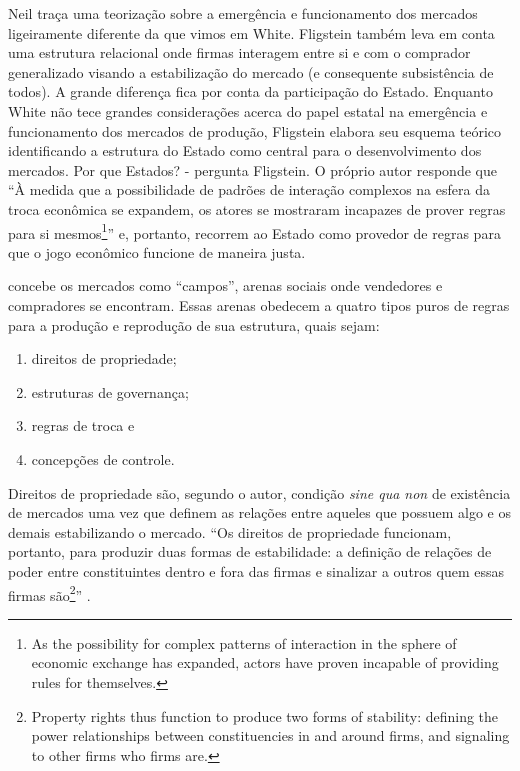\documentclass[a4paper, 12pt, openright, oneside, german, french, english, brazil]{abntex2}
\begin{document}
	Neil  traça uma teorização sobre a emergência e funcionamento dos mercados ligeiramente diferente da que vimos em White. Fligstein também leva em conta uma estrutura relacional onde firmas interagem entre si e com o comprador generalizado visando a estabilização do mercado (e consequente subsistência de todos). A grande diferença fica por conta da participação do Estado. Enquanto White não tece grandes considerações acerca do papel estatal na emergência e funcionamento dos mercados de produção, Fligstein elabora seu esquema teórico identificando a estrutura do Estado como central para o desenvolvimento dos mercados. Por que Estados? - pergunta Fligstein. O próprio autor responde que ``À medida que a possibilidade de padrões de interação complexos na esfera da troca econômica se expandem, os atores se mostraram incapazes de prover regras para si mesmos\footnote{As the possibility for complex patterns of interaction in the sphere of economic exchange has expanded, actors have proven incapable of providing rules for themselves.}'' \cite[p. 27-8]{fligstein2002architecture} e, portanto, recorrem ao Estado como provedor de regras para que o jogo econômico funcione de maneira justa.
	
	 concebe os mercados como ``campos'', arenas sociais onde vendedores e compradores se encontram. Essas arenas obedecem a quatro tipos puros de regras para a produção e reprodução de sua estrutura, quais sejam:
	
	\begin{enumerate}
		\item direitos de propriedade;
		\item estruturas de governança;
		\item regras de troca e
		\item concepções de controle.
	\end{enumerate}
	
	Direitos de propriedade são, segundo o autor, condição \textit{sine qua non} de existência de mercados uma vez que definem as relações entre aqueles que possuem algo e os demais estabilizando o mercado. ``Os direitos de propriedade funcionam, portanto, para produzir duas formas de estabilidade: a definição de relações de poder entre constituintes dentro e fora das firmas e sinalizar a outros quem essas firmas são\footnote{Property rights thus function to produce two forms of stability: defining the power relationships between constituencies in and around firms, and signaling to other firms who firms are.}'' \cite[p. 34]{fligstein2002architecture}.
	
\end{document}
